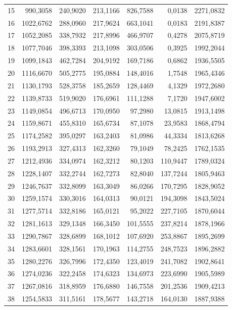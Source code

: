 \begin{small}
\begin{longtable}{rrrrrrr}
15 & 990,3058 & 240,9020 & 213,1166 & 826,7588 & 0,0138 & 2271,0832 \\
16 & 1022,6762 & 288,0960 & 217,9624 & 663,1041 & 0,0183 & 2191,8387 \\
17 & 1052,2085 & 338,7932 & 217,8996 & 466,9707 & 0,4278 & 2075,8719 \\
18 & 1077,7046 & 398,3393 & 213,1098 & 303,0506 & 0,3925 & 1992,2044 \\
19 & 1099,1843 & 462,7284 & 204,9192 & 169,7186 & 0,6862 & 1936,5505 \\
20 & 1116,6670 & 505,2775 & 195,0884 & 148,4016 & 1,7548 & 1965,4346 \\
21 & 1130,1793 & 528,3758 & 185,2659 & 128,4469 & 4,1329 & 1972,2680 \\
22 & 1139,8733 & 519,9020 & 176,6961 & 111,1288 & 7,1720 & 1947,6002 \\
23 & 1149,0854 & 496,6713 & 170,0950 & 97,2980 & 13,0815 & 1913,1498 \\
24 & 1159,8671 & 455,8310 & 165,6734 & 87,1078 & 23,9583 & 1868,4794 \\
25 & 1174,2582 & 395,0297 & 163,2403 & 81,0986 & 44,3334 & 1813,6268 \\
26 & 1193,2913 & 327,4313 & 162,3260 & 79,1049 & 78,2425 & 1762,1535 \\
27 & 1212,4936 & 334,0974 & 162,3212 & 80,1203 & 110,9447 & 1789,0324 \\
28 & 1228,1407 & 332,2744 & 162,7273 & 82,8040 & 137,7244 & 1805,9463 \\
29 & 1246,7637 & 332,8099 & 163,3049 & 86,0266 & 170,7295 & 1828,9052 \\
30 & 1259,1574 & 330,3016 & 164,0313 & 90,0121 & 194,3098 & 1843,5024 \\
31 & 1277,5714 & 332,8186 & 165,0121 & 95,2022 & 227,7105 & 1870,6044 \\
32 & 1281,1613 & 329,1348 & 166,3450 & 101,5555 & 237,8214 & 1878,1966 \\
33 & 1290,7867 & 328,6899 & 168,1012 & 107,6920 & 253,8867 & 1895,2699 \\
34 & 1283,6601 & 328,1561 & 170,1963 & 114,2755 & 248,7523 & 1896,2882 \\
35 & 1280,2276 & 326,7996 & 172,4350 & 123,4019 & 241,7082 & 1902,8641 \\
36 & 1274,0236 & 322,2458 & 174,6323 & 134,6973 & 223,6990 & 1905,5989 \\
37 & 1267,0816 & 318,8959 & 176,6880 & 146,7558 & 201,2536 & 1909,4213 \\
38 & 1254,5833 & 311,5161 & 178,5677 & 143,2718 & 164,0130 & 1887,9388 \\

\end{longtable}
\end{small}

